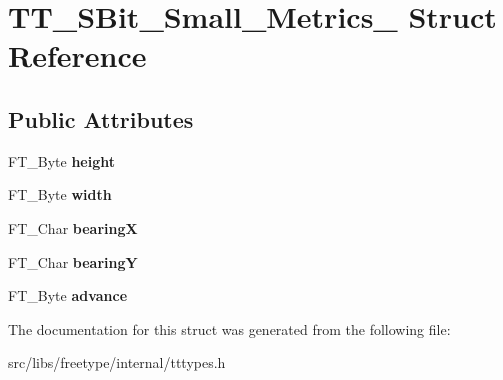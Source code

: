 \hypertarget{struct_t_t___s_bit___small___metrics__}{
\section{TT\_\-SBit\_\-Small\_\-Metrics\_\- Struct Reference}
\label{struct_t_t___s_bit___small___metrics__}
}
\subsection*{Public Attributes}
\begin{DoxyCompactItemize}
\item 
\hypertarget{struct_t_t___s_bit___small___metrics___aecc44b5e504d5ce27521505ed53420c8}{
FT\_\-Byte {\bfseries height}}
\label{struct_t_t___s_bit___small___metrics___aecc44b5e504d5ce27521505ed53420c8}

\item 
\hypertarget{struct_t_t___s_bit___small___metrics___ad2401ae208b1663d0085ca06a04885fe}{
FT\_\-Byte {\bfseries width}}
\label{struct_t_t___s_bit___small___metrics___ad2401ae208b1663d0085ca06a04885fe}

\item 
\hypertarget{struct_t_t___s_bit___small___metrics___a4361ae83a66706852c0c7d4c4ddff9c2}{
FT\_\-Char {\bfseries bearingX}}
\label{struct_t_t___s_bit___small___metrics___a4361ae83a66706852c0c7d4c4ddff9c2}

\item 
\hypertarget{struct_t_t___s_bit___small___metrics___aba8cbfd6203f4083b8fb305f88d6d1fc}{
FT\_\-Char {\bfseries bearingY}}
\label{struct_t_t___s_bit___small___metrics___aba8cbfd6203f4083b8fb305f88d6d1fc}

\item 
\hypertarget{struct_t_t___s_bit___small___metrics___a056c5ea71ec3339ca9b7356ea7c90e37}{
FT\_\-Byte {\bfseries advance}}
\label{struct_t_t___s_bit___small___metrics___a056c5ea71ec3339ca9b7356ea7c90e37}

\end{DoxyCompactItemize}


The documentation for this struct was generated from the following file:\begin{DoxyCompactItemize}
\item 
src/libs/freetype/internal/tttypes.h\end{DoxyCompactItemize}
